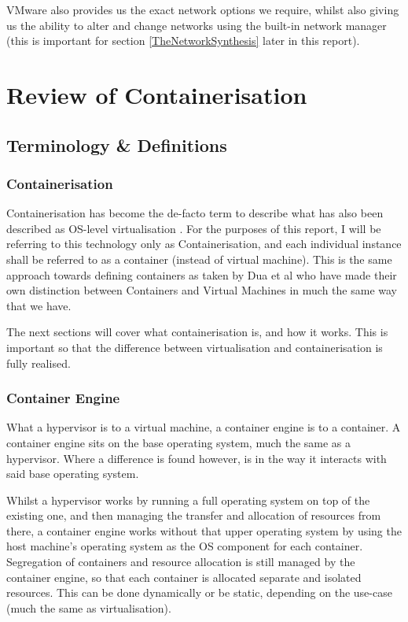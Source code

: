 VMware also provides us the exact network options we require, whilst also giving us the ability to alter and change networks using the built-in network manager \citep{VMwareNetChange} (this is important for section \ref{TheNetworkSynthesis} later in this report).

\chapter{Review of Containerisation}
\label{chap:containerisationReview}

\section{Terminology \& Definitions}

\subsection{Containerisation}
\label{sec:containerisation}
Containerisation has become the de-facto term to describe what has also been described as OS-level virtualisation \citep{hogg_2014}. For the purposes of this report, I will be referring to this technology only as Containerisation, and each individual instance shall be referred to as a container (instead of virtual machine). This is the same approach towards defining containers as taken by Dua et al \citep{dua14} who have made their own distinction between Containers and Virtual Machines in much the same way that we have.

The next sections will cover what containerisation is, and how it works. This is important so that the difference between virtualisation and containerisation is fully realised.

\subsection{Container Engine}
\label{Container Engine}
What a hypervisor is to a virtual machine, a container engine is to a container. A container engine sits on the base operating system, much the same as a hypervisor. Where a difference is found however, is in the way it interacts with said base operating system.

Whilst a hypervisor works by running a full operating system on top of the existing one, and then managing the transfer and allocation of resources from there, a container engine works without that upper operating system by using the host machine's operating system as the OS component for each container. Segregation of containers and resource allocation is still managed by the container engine, so that each container is allocated separate and isolated resources. This can be done dynamically or be static, depending on the use-case (much the same as virtualisation).

